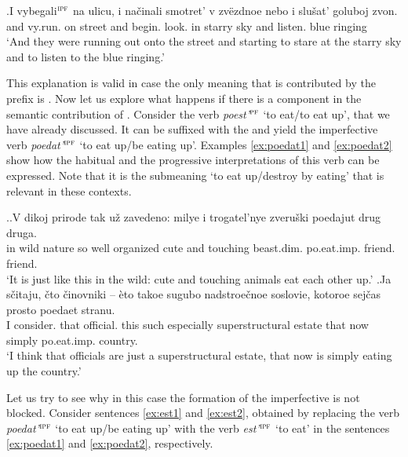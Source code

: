 \exg.\label{ex:vybegat}I vybegali$^{\textsc{ipf}}$ na ulicu, i na\v{c}inali smotret' v zv\"{e}zdnoe nebo i slu\v{s}at' goluboj zvon.\\
and vy.run. on street and begin. look. in starry sky and listen. blue ringing\\
\trans `And they were running out onto the street and starting to stare at the starry sky and to listen to the blue ringing.'

This explanation is valid in case the only meaning that is contributed by the prefix is . Now let us explore what happens if there is a  component in the semantic contribution of . Consider the verb \textit{poest'}$^{\textsc{pf}}$ `to eat/to eat up', that we have already discussed. It can be suffixed with the  and yield the imperfective verb \textit{poedat'}$^{\textsc{ipf}}$ `to eat up/be eating up'. Examples \ref{ex:poedat1} and \ref{ex:poedat2} show how the habitual and the progressive interpretations of this verb can be expressed. Note that it is the submeaning `to eat up/destroy by eating' that is relevant in these contexts.

\ex.\ag.\label{ex:poedat1}V dikoj prirode tak u\v{z} zavedeno: milye i trogatel'nye zveru\v{s}ki poedajut drug druga.\\
in wild nature so well organized cute and touching beast.dim. po.eat.imp. friend. friend.\\
\trans `It is just like this in the wild: cute and touching animals eat each other up.'
\bg.\label{ex:poedat2}Ja s\v{c}itaju, \v{c}to \v{c}inovniki -- \`{e}to takoe sugubo nadstroe\v{c}noe soslovie, kotoroe sej\v{c}as prosto poedaet stranu.\\
I consider. that official. {} this such especially superstructural estate that now simply po.eat.imp. country.\\
\trans `I think that officials are just a superstructural estate, that now is simply eating up the country.'\\

Let us try to see why in this case the formation of the imperfective is not blocked. Consider sentences \ref{ex:est1} and \ref{ex:est2}, obtained by replacing the verb \textit{poedat'}$^{\textsc{ipf}}$ `to eat up/be eating up' with the verb \textit{est'}$^{\textsc{ipf}}$ `to eat' in the sentences \ref{ex:poedat1} and \ref{ex:poedat2}, respectively.
 
